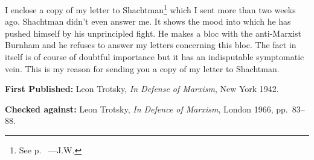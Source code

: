 \newpage


I enclose a copy of my letter to Shachtman\footnote{See p.~\pageref{1939-12-20_a-letter-to-max-shachtman} ---J.W.} which I sent more than two weeks ago. Shachtman didn’t even answer me. It shows the mood into which he has pushed himself by his unprincipled fight. He makes a bloc with the anti-Marxist Burnham and he refuses to answer my letters concerning this bloc. The fact in itself is of course of doubtful importance but it has an indisputable symptomatic vein. This is my reason for sending you a copy of my letter to Shachtman.


\begin{letterinfo}
	\textbf{First Published:} Leon Trotsky, \emph{In Defense of Marxism}, New York 1942.
	
	\textbf{Checked against:} Leon Trotsky, \emph{In Defence of Marxism}, London 1966, pp.~83--88.
\end{letterinfo}